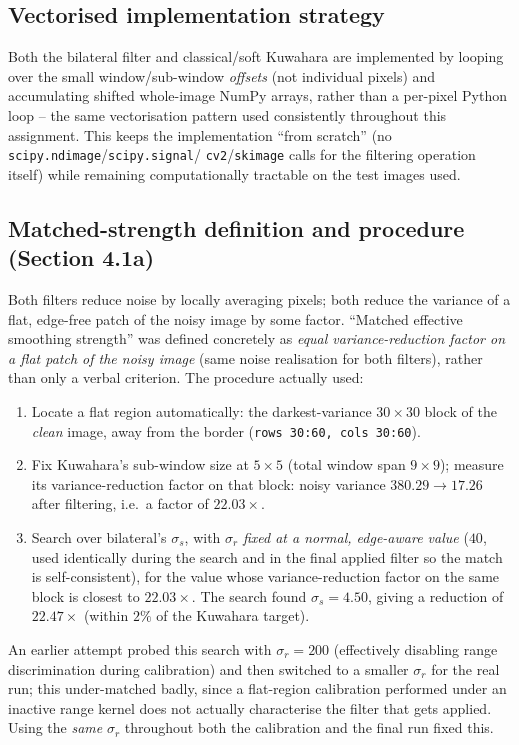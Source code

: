 \documentclass[11pt]{article}
\begin{document}
\subsection{Vectorised implementation strategy}

Both the bilateral filter and classical/soft Kuwahara are implemented by looping over
the small window/sub-window \emph{offsets} (not individual pixels) and accumulating
shifted whole-image NumPy arrays, rather than a per-pixel Python loop -- the same
vectorisation pattern used consistently throughout this assignment. This keeps the
implementation ``from scratch'' (no \texttt{scipy.ndimage}/\texttt{scipy.signal}/
\texttt{cv2}/\texttt{skimage} calls for the filtering operation itself) while remaining
computationally tractable on the test images used.

\subsection{Matched-strength definition and procedure (Section 4.1a)}

Both filters reduce noise by locally averaging pixels; both reduce the variance of a
flat, edge-free patch of the noisy image by some factor. ``Matched effective smoothing
strength'' was defined concretely as \emph{equal variance-reduction factor on a flat
patch of the noisy image} (same noise realisation for both filters), rather than only a
verbal criterion. The procedure actually used:
\begin{enumerate}[leftmargin=1.5em]
  \item Locate a flat region automatically: the darkest-variance $30\times 30$ block of
  the \emph{clean} image, away from the border (\texttt{rows 30:60, cols 30:60}).
  \item Fix Kuwahara's sub-window size at $5\times 5$ (total window span $9\times 9$);
  measure its variance-reduction factor on that block: noisy variance $380.29 \to 17.26$
  after filtering, i.e.\ a factor of $22.03\times$.
  \item Search over bilateral's $\sigma_s$, with $\sigma_r$ \emph{fixed at a normal,
  edge-aware value} ($40$, used identically during the search and in the final applied
  filter so the match is self-consistent), for the value whose variance-reduction factor
  on the same block is closest to $22.03\times$. The search found $\sigma_s=4.50$, giving
  a reduction of $22.47\times$ (within $2\%$ of the Kuwahara target).
\end{enumerate}
An earlier attempt probed this search with $\sigma_r=200$ (effectively disabling range
discrimination during calibration) and then switched to a smaller $\sigma_r$ for the
real run; this under-matched badly, since a flat-region calibration performed under an
inactive range kernel does not actually characterise the filter that gets applied. Using
the \emph{same} $\sigma_r$ throughout both the calibration and the final run fixed this.
\end{document}
